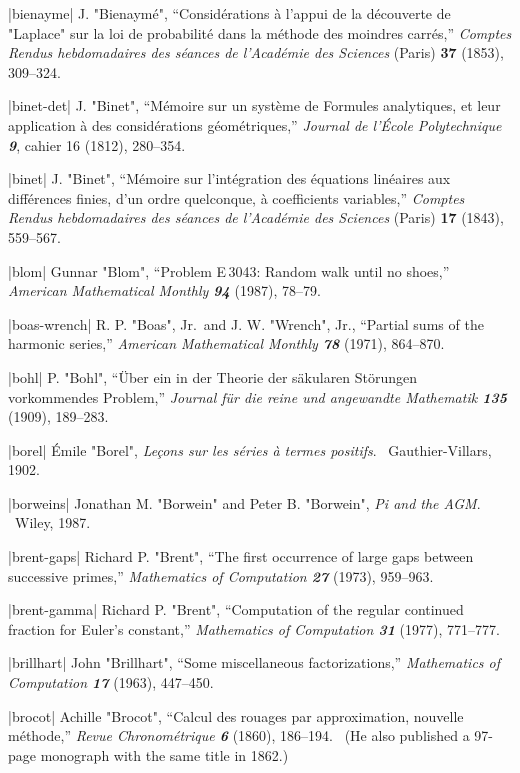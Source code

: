 \bib|bienayme|%
J. "Bienaym\'e", ``Consid\'erations \`a l'appui de la d\'ecouverte de "Laplace"
sur la loi de probabilit\'e dans la m\'ethode des moindres carr\'es,''
{\sl Comptes Rendus hebdomadaires des s\'eances de l'Acad\'emie des Sciences\/}
(Paris) {\bf37} (1853), 309--324.

\bib|binet-det|%
J. "Binet", ``M\'emoire sur un syst\`eme de Formules analytiques, et leur
application \`a des consid\'erations g\'eom\'etriques,''
{\sl Journal de l'\'Ecole Polytechnique\/ \bf9}, cahier 16 (1812),
280--354.

\bib|binet|%
J. "Binet", ``M\'emoire sur l'int\'egration des \'equations lin\'eaires
aux diff\'e\-ren\-ces finies, d'un ordre quelconque, \`a coefficients
variables,'' {\sl Comptes Rendus hebdomadaires des s\'eances
 de l'Acad\'emie des  Sciences\/} (Paris) {\bf17} (1843), 559--567.

\bib|blom|%
Gunnar "Blom", ``Problem E\,3043: Random walk until no shoes,''
{\sl American Mathematical Monthly\/ \bf94} (1987), 78--79.

\bib|boas-wrench|%
R. P. "Boas", Jr.\ and J. W. "Wrench", Jr., ``Partial sums of the harmonic
series,'' {\sl American Mathematical Monthly\/ \bf78} (1971), 864--870.

\bib|bohl|%
P. "Bohl", ``\"Uber ein in der Theorie der s\"akularen St\"orungen vorkommendes
Problem,'' {\sl Journal f\"ur die reine und angewandte Mathematik\/ \bf135}
(1909), 189--283.

\bib|borel|%
\'Emile "Borel", {\sl Le\c cons sur les s\'eries \`a termes positifs}. \
Gauthier-Villars, 1902.

\bib|borweins|%
Jonathan M. "Borwein" and Peter B. "Borwein", {\sl Pi and the AGM}. \
Wiley, 1987.

\bib|brent-gaps|%
Richard P. "Brent", ``The first occurrence of large gaps between
successive primes,'' {\sl Mathematics of Computation\/ \bf27} (1973), 959--963.

\bib|brent-gamma|%
Richard P. "Brent", ``Computation of the regular continued fraction for
Euler's constant,''
{\sl Mathematics of Computation\/ \bf31} (1977), 771--777.

\bib|brillhart|%
John "Brillhart", ``Some miscellaneous factorizations,''
{\sl Mathematics of Computation\/ \bf17} (1963), 447--450.

\bib|brocot|%
Achille "Brocot", ``Calcul des rouages par approximation, nouvelle m\'e\-thode,''
{\sl Revue Chronom\'etrique\/ \bf6} (1860), 186--194.
\ (He also published a 97-page monograph with the same title in 1862.)

